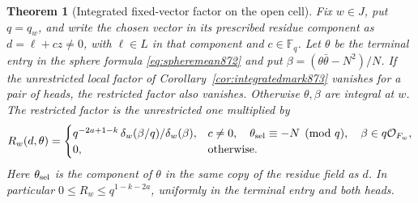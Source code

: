 \documentclass[a4paper,11pt]{article}
\newtheorem{theorem}[proposition]{Theorem}
\theoremstyle{definition}
\theoremstyle{remark}
\numberwithin{equation}{section}
\begin{document}
\begin{theorem}[Integrated fixed-vector factor on the open cell]\leavevmode
\label{thm:selectedopen874}
Fix \(w\in J\), put \(q=q_w\), and write the chosen vector in its prescribed
residue component as \(d=\ell+c z\ne0\), with \(\ell\in L\) in that component
and \(c\in\mathbb F_q\). Let \(\theta\) be the terminal entry in the sphere
formula \eqref{eq:spheremean872} and put \(\beta=(\theta\bar\theta-N^2)/N\).
If the unrestricted local factor of Corollary~\ref{cor:integratedmark873}
vanishes for a pair of heads, the restricted factor also vanishes. Otherwise
\(\theta,\beta\) are integral at \(w\). The restricted factor is the
unrestricted one multiplied by
\begin{equation}
 R_w(d,\theta)=
 \begin{cases}
 q^{-2a+1-k}\,\delta_w(\beta/q)/\delta_w(\beta),
 &c\ne0,\quad \theta_{\rm sel}\equiv-N\pmod q,\quad
                         \beta\in q\mathcal O_{F_w},\\
 0,&\text{otherwise}.
 \end{cases}
 \label{eq:fixedratio874}
\end{equation}
Here \(\theta_{\rm sel}\) is the component of \(\theta\) in the same
copy of the residue field as \(d\). In particular \(0\le R_w\le
q^{1-k-2a}\), uniformly in the terminal entry and both heads.
\end{theorem}
\end{document}
